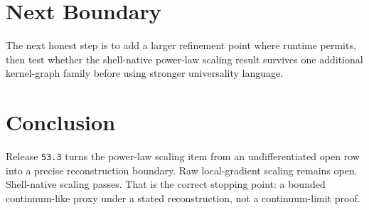 \documentclass[11pt]{article}
\begin{document}
\section{Next Boundary}

The next honest step is to add a larger refinement point where runtime permits, then test whether the shell-native power-law scaling result survives one additional kernel-graph family before using stronger universality language.

\section{Conclusion}

Release \texttt{53.3} turns the power-law scaling item from an undifferentiated open row into a precise reconstruction boundary. Raw local-gradient scaling remains open. Shell-native scaling passes. That is the correct stopping point: a bounded continuum-like proxy under a stated reconstruction, not a continuum-limit proof.
\end{document}

